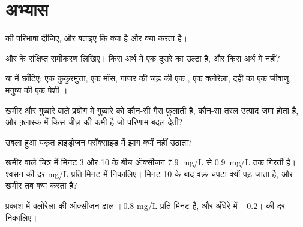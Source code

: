 \section{अभ्यास}

\begin{exercise}[$\star$]\label{exo:g10:cell-metabolism:1}
 की परिभाषा दीजिए, और बताइए कि  क्या है और क्या करता है।
\end{exercise}

\begin{exercise}[$\star$]\label{exo:g10:cell-metabolism:2}
 और  के संक्षिप्त समीकरण लिखिए। किस अर्थ में
एक दूसरे का उल्टा है, और किस अर्थ में नहीं?
\end{exercise}

\begin{exercise}[$\star$]\label{exo:g10:cell-metabolism:3}
 या  में छाँटिए: एक कुकुरमुत्ता, एक मॉस, गाजर की जड़ की एक
, एक क्लोरेला, दही का एक जीवाणु, मनुष्य की एक पेशी ।
\end{exercise}

\begin{exercise}[$\star$]\label{exo:g10:cell-metabolism:4}
खमीर और गुब्बारे वाले प्रयोग में गुब्बारे को कौन-सी गैस फुलाती है, कौन-सा
तरल उत्पाद जमा होता है, और फ़्लास्क में किस चीज़ की कमी है जो परिणाम बदल
देती?
\end{exercise}

\begin{exercise}[$\star$]\label{exo:g10:cell-metabolism:5}
उबला हुआ यकृत हाइड्रोजन परॉक्साइड में झाग क्यों नहीं उठाता?
\end{exercise}

\begin{exercise}[$\star\star$]\label{exo:g10:cell-metabolism:6}
खमीर वाले चित्र में मिनट 3 और 10 के बीच ऑक्सीजन \qty{7.9}{mg/L} से
\qty{0.9}{mg/L} तक गिरती है। श्वसन की दर \unit{mg/L} प्रति मिनट में
निकालिए। मिनट 10 के बाद वक्र चपटा क्यों पड़ जाता है, और खमीर तब क्या
करता है?
\end{exercise}

\begin{exercise}[$\star\star$]\label{exo:g10:cell-metabolism:7}
प्रकाश में क्लोरेला की ऑक्सीजन-ढाल $+0.8$ \unit{mg/L} प्रति मिनट है,
और अँधेरे में $-0.2$।  की दर निकालिए।
\end{exercise}

